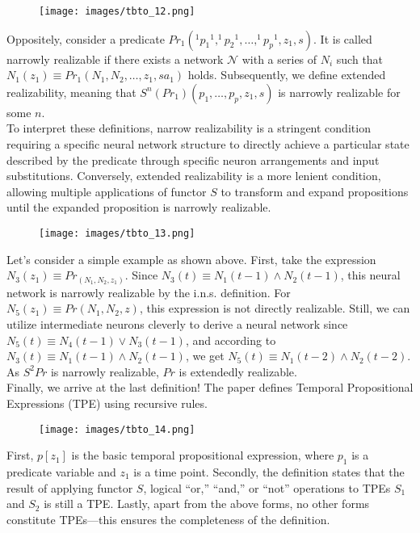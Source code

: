 \documentclass[11p,oneside]{book}
\begin{document}
\begin{figure}[H]
    \centering
    \texttt{[image: images/tbto\_12.png]}
\end{figure}

Oppositely, consider a predicate $Pr_1(^1{p_1}^1, ^1{p_2}^1, \ldots, ^1{p_p}^1, z_1, s)$. It is called narrowly realizable if there exists a network $\mathcal{N}$ with a series of $N_i$ such that $N_1(z_1) \equiv Pr_1(N_1, N_2, \ldots, z_1, sa_1)$ holds. Subsequently, we define extended realizability, meaning that $S^n(Pr_1)(p_1, \ldots, p_p, z_1, s)$ is narrowly realizable for some $n$.
\\

To interpret these definitions, narrow realizability is a stringent condition requiring a specific neural network structure to directly achieve a particular state described by the predicate through specific neuron arrangements and input substitutions. Conversely, extended realizability is a more lenient condition, allowing multiple applications of functor $S$ to transform and expand propositions until the expanded proposition is narrowly realizable.

\begin{figure}[H]
    \centering
    \texttt{[image: images/tbto\_13.png]}
\end{figure}

Let’s consider a simple example as shown above. First, take the expression $N_3(z_1) \equiv Pr_(N_1, N_2, z_1)$. Since $N_3(t) \equiv N_1(t-1) \land N_2(t-1)$, this neural network is narrowly realizable by the i.n.s. definition. For $N_5(z_1) \equiv Pr(N_1, N_2, z)$, this expression is not directly realizable. Still, we can utilize intermediate neurons cleverly to derive a neural network since $N_5(t) \equiv N_4(t-1) \lor N_3(t-1)$, and according to $N_3(t) \equiv N_1(t-1) \land N_2(t-1)$, we get $N_5(t) \equiv N_1(t-2) \land N_2(t-2)$. As $S^2 Pr$ is narrowly realizable, $Pr$ is extendedly realizable.
\\

Finally, we arrive at the last definition! The paper defines Temporal Propositional Expressions (TPE) using recursive rules.

\begin{figure}[H]
    \centering
    \texttt{[image: images/tbto\_14.png]}
\end{figure}

First, $p[z_1]$ is the basic temporal propositional expression, where $p_1$ is a predicate variable and $z_1$ is a time point. Secondly, the definition states that the result of applying functor $S$, logical “or,” “and,” or “not” operations to TPEs $S_1$ and $S_2$ is still a TPE. Lastly, apart from the above forms, no other forms constitute TPEs—this ensures the completeness of the definition.
\end{document}
